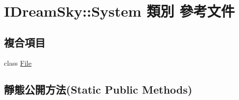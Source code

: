 \hypertarget{class_i_dream_sky_1_1_system}{}\section{I\+Dream\+Sky\+:\+:System 類別 參考文件}
\label{class_i_dream_sky_1_1_system}
\subsection*{複合項目}
\begin{DoxyCompactItemize}
\item 
class \hyperlink{class_i_dream_sky_1_1_system_1_1_file}{File}
\end{DoxyCompactItemize}
\subsection*{靜態公開方法(Static Public Methods)}
